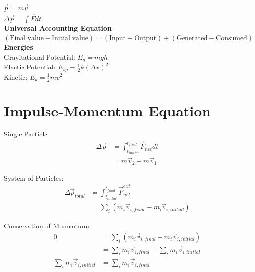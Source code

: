 \documentclass{article}
\begin{document}
$\vec{p} = m \vec{v}$ \\
$\Delta \vec{p} = \int\vec{F}dt$ \\

\textbf{Universal Accounting Equation} \\
$(\text{Final value} - \text{Initial value}) = (\text{Input} - \text{Output}) + (\text{Generated} - \text{Consumed})$ \\

\textbf{Energies} \\
Gravitational Potential: $E_g = mgh$ \\
Elastic Potential: $E_{sp} = \frac{1}{2} k (\Delta x)^2$ \\
Kinetic: $E_k = \frac{1}{2}mv^2$ \\

\clearpage


\section*{Impulse-Momentum Equation}
Single Particle:
\begin{align*}
    \Delta\vec{p} &= \int_{t_{initial}}^{t_{final}} \vec{F}_{net} dt  \\
                  &= m\vec{v}_2 - m\vec{v}_1
\end{align*}

System of Particles: 
\begin{align*}
    \Delta\vec{p}_{total} &= \int_{t_{initial}}^{t_{final}} \vec{F}_{net}^{ext} \\
                          &= \sum_i \left( m_i\vec{v}_{i, final} - m_i\vec{v}_{i, initial} \right)
\end{align*}

Conservation of Momentum:
\begin{align*}
    0 &= \sum_i \left( m_i\vec{v}_{i, final} - m_i\vec{v}_{i, initial} \right) \\
      &= \sum_i m_i\vec{v}_{i, final} - \sum_i m_i\vec{v}_{i, initial} \\
    \sum_i m_i\vec{v}_{i, initial} &= \sum_i m_i\vec{v}_{i, final}
\end{align*}

\clearpage

\end{document}
